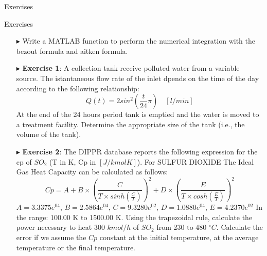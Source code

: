 \documentclass[xcolor={dvipsnames,rgb}, aspectratio=169]{beamer}
\begin{document}
{%
   \begin{frame}[standout]
	   Exercises
   \end{frame}
}

\begin{frame}{Exercises}
   \begin{itemize}
      \item[$\blacktriangleright$] Write a MATLAB function to
         perform the numerical integration with the bezout formula and aitken formula.
      \item[$\blacktriangleright$] \textbf{Exercise 1}: A collection tank receive
         polluted water from a variable source. The istantaneous flow rate of the inlet
         dpends on the time of the day according to the following relationship:
         \begin{equation*}
            Q(t) = 2 sin^{2}\left(\frac{t}{24}\pi\right) \quad [l/min]
         \end{equation*}
         At the end of the 24 hours period tank is emptied and the water is moved to a
         treatment facility. Determine the appropriate size of the tank (i.e., the volume
         of the tank).
   \end{itemize}
\end{frame}

\begin{frame}{}
   \begin{itemize}
      \item[$\blacktriangleright$] \textbf{Exercise 2}: The DIPPR database reports the
         following expression for the cp of $SO_{2}$ (T in K, Cp in $[J/kmol K]$). For
         SULFUR DIOXIDE The Ideal Gas Heat Capacity can be calculated as follows:
         \begin{equation*}
            Cp = A + B \times \left(\frac{C}{T \times
            sinh\left(\frac{C}{T}\right)}\right)^{2} + D \times \left(\frac{E}{T \times
            cosh\left(\frac{E}{T}\right)}\right)^{2}
         \end{equation*}
         $A = 3.3375e^{04}$, $B = 2.5864e^{04}$, $C = 9.3280e^{02}$, $D = 1.0880e^{04}$,
         $E = 4.2370e^{02}$ In the range: 100.00 K to 1500.00 K. Using the trapezoidal
         rule, calculate the power necessary to heat 300 $kmol/h$ of $SO_{2}$ from 230 to
         480 $^\circ C$. Calculate the error if we assume the $Cp$ constant at the
         initial temperature, at the average temperature or the final temperature.
   \end{itemize}
\end{frame}
\end{document}

